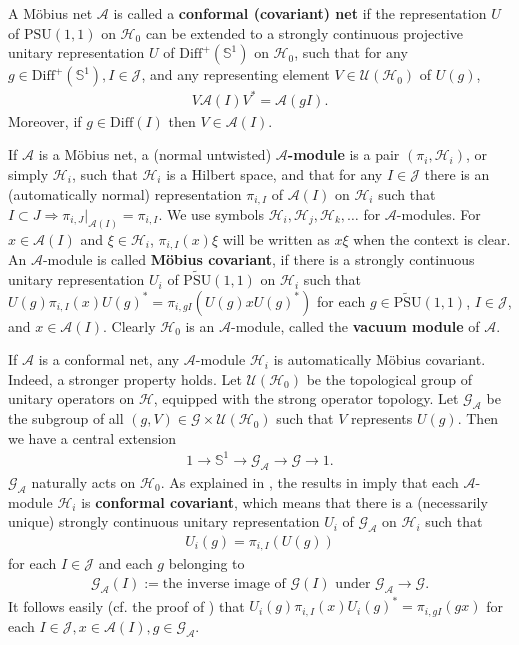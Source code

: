 \documentclass[11pt,b5paper,notitlepage]{article}
\theoremstyle{definition}
\theoremstyle{plain}
\newcommand{\mc}{\mathcal}
\newcommand{\Diffp}{\mathrm{Diff}^+}
\newcommand{\Diff}{\mathrm{Diff}}
\newcommand{\PSU}{\mathrm{PSU}(1,1)}
\newcommand{\GA}{\mathscr G_{\mathcal A}}
\newcommand{\scr}{\mathscr}
\newcommand{\mbb}{\mathbb}
\newcommand{\UPSU}{\widetilde{\mathrm{PSU}}(1,1)}
\newcommand{\Sbb}{{\mathbb S}}
\numberwithin{equation}{section}
\begin{document}
A M\"obius net $\mc A$ is called a \textbf{conformal (covariant) net} if the representation $U$ of $\PSU$ on $\mc H_0$ can be extended to a strongly continuous projective unitary representation $U$ of $\Diffp(\mbb S^1)$ on $\mathcal H_0$, such that for any $g\in \Diffp(\mbb S^1),I\in\mathcal J$, and any representing element $V\in\mathcal U(\mathcal H_0)$ of $U(g)$,
\begin{align*}
	V\mathcal A(I)V^*=\mathcal A(gI).
\end{align*}
Moreover, if $g\in\Diff(I)$ then $V\in\mc A(I)$.



If $\mc A$ is a M\"obius net, a (normal untwisted) \textbf{$\mc A$-module} is a pair $(\pi_i,\mc H_i)$, or simply $\mc H_i$, such that $\mc H_i$ is a Hilbert space, and that for any $I\in\mc J$ there is an (automatically normal)  representation $\pi_{i,I}$ of $\mc A(I)$ on $\mc H_i$ such that $I\subset J\Rightarrow \pi_{i,J}|_{\mc A(I)}=\pi_{i,I}$. We use symbols $\mc H_i,\mc H_j,\mc H_k,\dots$ for $\mc A$-modules. For $x\in\mc A(I)$ and $\xi\in\mc H_i$, $\pi_{i,I}(x)\xi$ will be written as $x\xi$ when the context is clear. An $\mc A$-module is called \textbf{M\"obius covariant}, if there is a strongly continuous unitary representation $U_i$ of $\UPSU$ on $\mc H_i$ such that $U(g)\pi_{i,I}(x)U(g)^*=\pi_{i,gI}(U(g)xU(g)^*)$ for each $g\in\UPSU$, $I\in\mc J$, and $x\in\mc A(I)$. Clearly $\mc H_0$ is an $\mc A$-module, called the \textbf{vacuum module} of $\mc A$.

If $\mc A$ is a conformal net, any $\mc A$-module $\mc H_i$ is automatically M\"obius covariant. Indeed, a stronger property holds. Let $\mc U(\mc H_0)$ be the topological group of unitary operators on $\mc H$, equipped with the strong operator topology. Let $\GA$ be the subgroup of all $(g,V)\in\scr G\times\mc U(\mc H_0)$ such that $V$ represents $U(g)$. Then we have a central extension
\begin{align*}
	1\rightarrow \Sbb^1\rightarrow \GA\rightarrow\scr G\rightarrow 1.
\end{align*}
$\GA$ naturally acts on $\mc H_0$. As explained in \cite[Thm. 2.2]{Gui21a}, the results in \cite{Hen19} imply that   each $\mc A$-module $\mc H_i$ is \textbf{conformal covariant}, which means that there is a (necessarily unique) strongly continuous unitary representation $U_i$ of $\GA$ on $\mc H_i$ such that
\begin{align}
U_i(g)=\pi_{i,I}(U(g))	\label{eq1}
\end{align}
for each $I\in\mc J$ and each $g$ belonging to 
\begin{align*}
\GA(I):=\text{the inverse image of $\scr G(I)$ under $\GA\rightarrow\scr G$}.	
\end{align*}
It follows easily (cf. the proof of \cite[Cor. 2.6]{Gui21a}) that   $U_i(g)\pi_{i,I}(x)U_i(g)^*=\pi_{i,gI}(gx)$ for each $I\in\mc J,x\in\mc A(I),g\in\GA$.
 
\end{document}
